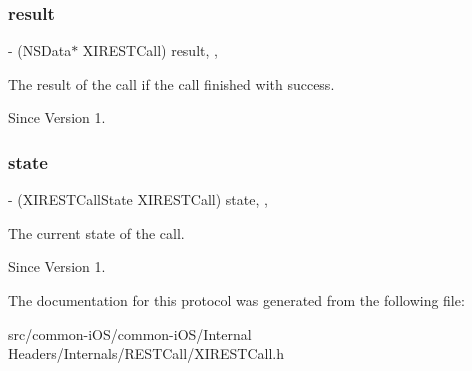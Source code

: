 \subsubsection{\texorpdfstring{result}{result}}
{\footnotesize\ttfamily -\/ (N\+S\+Data$\ast$ X\+I\+R\+E\+S\+T\+Call) result\hspace{0.3cm}{\ttfamily [read]}, {\ttfamily [nonatomic]}, {\ttfamily [assign]}}



The result of the call if the call finished with success. 

\begin{DoxySince}{Since}
Version 1. 
\end{DoxySince}
\hypertarget{protocol_x_i_r_e_s_t_call_01-p_a97493d9eebb0ebd6b0ccd33b92e2b32e}{}\label{protocol_x_i_r_e_s_t_call_01-p_a97493d9eebb0ebd6b0ccd33b92e2b32e} 
\subsubsection{\texorpdfstring{state}{state}}
{\footnotesize\ttfamily -\/ (X\+I\+R\+E\+S\+T\+Call\+State X\+I\+R\+E\+S\+T\+Call) state\hspace{0.3cm}{\ttfamily [read]}, {\ttfamily [nonatomic]}, {\ttfamily [assign]}}



The current state of the call. 

\begin{DoxySince}{Since}
Version 1. 
\end{DoxySince}


The documentation for this protocol was generated from the following file\+:\begin{DoxyCompactItemize}
\item 
src/common-\/i\+O\+S/common-\/i\+O\+S/\+Internal Headers/\+Internals/\+R\+E\+S\+T\+Call/X\+I\+R\+E\+S\+T\+Call.\+h\end{DoxyCompactItemize}
